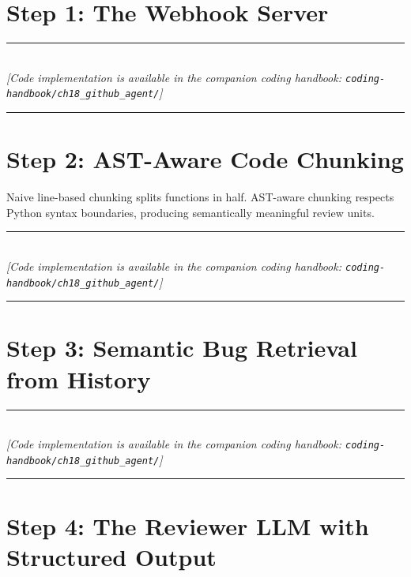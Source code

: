 \section{Step 1: The Webhook Server}


\begin{center}
\noindent\rule{0.6\textwidth}{0.4pt} \\
\vspace{0.3em}
\textit{[Code implementation is available in the companion coding handbook: \texttt{coding-handbook/ch18\_github\_agent/}]} \\
\noindent\rule{0.6\textwidth}{0.4pt}
\end{center}


\section{Step 2: AST-Aware Code Chunking}

Naive line-based chunking splits functions in half. AST-aware chunking respects Python syntax boundaries, producing semantically meaningful review units.


\begin{center}
\noindent\rule{0.6\textwidth}{0.4pt} \\
\vspace{0.3em}
\textit{[Code implementation is available in the companion coding handbook: \texttt{coding-handbook/ch18\_github\_agent/}]} \\
\noindent\rule{0.6\textwidth}{0.4pt}
\end{center}


\section{Step 3: Semantic Bug Retrieval from History}


\begin{center}
\noindent\rule{0.6\textwidth}{0.4pt} \\
\vspace{0.3em}
\textit{[Code implementation is available in the companion coding handbook: \texttt{coding-handbook/ch18\_github\_agent/}]} \\
\noindent\rule{0.6\textwidth}{0.4pt}
\end{center}


\section{Step 4: The Reviewer LLM with Structured Output}


